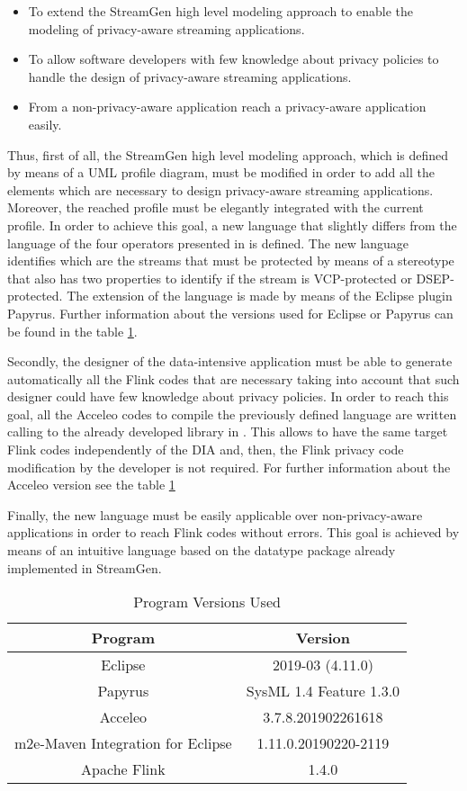 \begin{itemize}
\item To extend the StreamGen high level modeling approach to enable the modeling of privacy-aware streaming applications.
\item To allow software developers with few knowledge about privacy policies to handle the design of privacy-aware streaming applications.
\item From a non-privacy-aware application reach a privacy-aware application easily.
\end{itemize}

Thus, first of all, the StreamGen high level modeling approach, which is defined by means of a UML profile diagram, must be modified in order to add all the elements which are necessary to design privacy-aware streaming applications. Moreover, the reached profile must be elegantly integrated with the current profile. In order to achieve this goal, a new language that slightly differs from the language of the four operators presented in \cite{privacypoliciesarticle} is defined. The new language identifies which are the streams that must be protected by means of a stereotype that also has two properties to identify if the stream is VCP-protected or DSEP-protected. The extension of the language is made by means of the Eclipse plugin Papyrus. Further information about the versions used for Eclipse or Papyrus can be found in the table \ref{Program Versions Used}.

Secondly, the designer of the data-intensive application must be able to generate automatically all the Flink codes that are necessary taking into account that such designer could have few knowledge about privacy policies. In order to reach this goal, all the Acceleo codes to compile the previously defined language are written calling to the already developed library in \cite{privacypoliciesarticle}. This allows to have the same target Flink codes independently of the DIA and, then, the Flink privacy code modification by the developer is not required. For further information about the Acceleo version see the table \ref{Program Versions Used}

Finally, the new language must be easily applicable over non-privacy-aware applications in order to reach Flink codes without errors. This goal is achieved by means of an intuitive language based on the datatype package already implemented in StreamGen.

\begin{table}[h!]
\centering
	\begin{tabular}{||c|c||} 
	\hline\hline
	Program & Version \\ [1ex] 
	\hline\hline
	Eclipse & 2019-03 (4.11.0)  \\
	\hline
	Papyrus & SysML 1.4 Feature 1.3.0  \\
	\hline
	Acceleo & 3.7.8.201902261618  \\
	\hline
	m2e-Maven Integration for Eclipse & 1.11.0.20190220-2119  \\
	\hline
	Apache Flink & 1.4.0  \\
	\hline\hline
	\end{tabular}
\caption{Program Versions Used}
\label{Program Versions Used}
\end{table}


